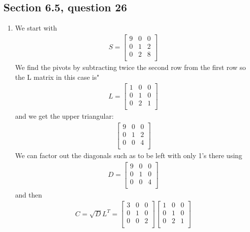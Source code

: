 \documentclass[a4paper,11pt]{article}
\newcommand{\?}{\stackrel{?}{=}}
\begin{document}
\subsection*{Section 6.5, question 26}
\begin{enumerate}
\item
We start with
\begin{align*}
S = 
\begin{bmatrix}
9 & 0 & 0 \\
0 & 1 & 2 \\
0 & 2 & 8 \\
\end{bmatrix}
\end{align*}
We find the pivots by subtracting twice the second row from the first row so the L matrix in this case is"
\begin{align*}
L = 
\begin{bmatrix}
1 & 0 & 0 \\
0 & 1 & 0 \\
0 & 2 & 1 \\
\end{bmatrix}
\end{align*}
and we get the upper triangular:
\begin{align*} 
\begin{bmatrix}
9 & 0 & 0 \\
0 & 1 & 2 \\
0 & 0 & 4 \\
\end{bmatrix}
\end{align*}
We can factor out the diagonals such as to be left with only 1's there using 
\begin{align*}
D = 
\begin{bmatrix}
9 & 0 & 0 \\
0 & 1 & 0 \\
0 & 0 & 4 \\
\end{bmatrix}
\end{align*}
and then 
\begin{align*}
C = \sqrt{D}L^T =
\begin{bmatrix}
3 & 0 & 0 \\
0 & 1 & 0 \\
0 & 0 & 2 \\
\end{bmatrix}
\begin{bmatrix}
1 & 0 & 0 \\
0 & 1 & 0 \\
0 & 2 & 1 \\

\end{bmatrix}
\end{align*}
\end{enumerate}
\end{document}
